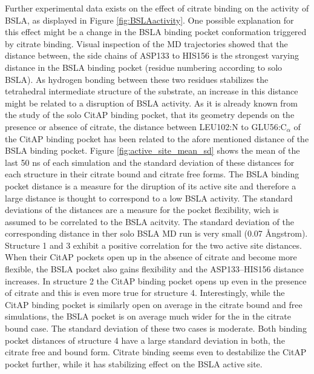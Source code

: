 \documentclass[english, a4paper, 12pt, titlepage, draft]{article}
\begin{document}
Further experimental data exists on the effect of citrate binding on the activity of BSLA, as displayed in Figure \ref{fig:BSLAactivity}.
One possible explanation for this effect might be a change in the BSLA binding pocket conformation triggered by citrate binding.
Visual inspection of the MD trajectories showed that the distance between, the side chains of ASP133 to HIS156 is the strongest varying distance in the BSLA binding pocket (residue numbering according to solo BSLA).
As hydrogen bonding between these two residues stabilizes the tetrahedral intermediate structure of the substrate, an increase in this distance might be related to a disruption of BSLA activity.
As it is already known from the study of the solo CitAP binding pocket, that its geometry depends on the presence or absence of citrate, the distance between LEU102:N to GLU56:C$_{\alpha}$ of the CitAP binding pocket has been related to the afore mentioned distance of the BSLA binding pocket.
Figure \ref{fig:active_site_mean_sd} shows the mean of the last 50 ns of each simulation and the standard deviation of these distances for each structure in their citrate bound and citrate free forms.
The BSLA binding pocket distance is a measure for the diruption of its active site and therefore a large distance is thought to correspond to a low BSLA activity.
The standard deviations of the distances are a measure for the pocket flexibility, wich is assumed to be correlated to the BSLA acitvity.
The standard deviation of the corresponding distance in ther solo BSLA MD run is very small (0.07 \r{A}ngstrom).
Structure 1 and 3 exhibit a positive correlation for the two active site distances.
When their CitAP pockets open up in the absence of citrate and become more flexible, the BSLA pocket also gains flexibility and the ASP133--HIS156 distance increases.
In structure 2 the CitAP binding pocket opens up even in the presence of citrate and this is even more true for structure 4.
Interestingly, while the CitAP binding pocket is similarly open on average in the citrate bound and free simulations, the BSLA pocket is on average much wider for the in the citrate bound case.
The standard deviation of these two cases is moderate.
Both binding pocket distances of structure 4 have a large standard deviation in both, the citrate free and bound form.
Citrate binding seems even to destabilize the CitAP pocket further, while it has stabilizing effect on the BSLA active site.
\end{document}
